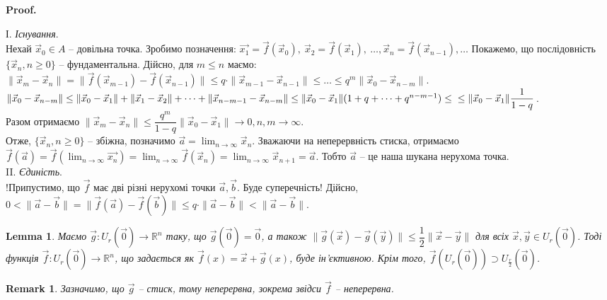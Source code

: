 \documentclass[a4paper, 10pt]{article}
\makeatletter
\theoremstyle{theoremdd}
\theoremstyle{theoremdd}
\theoremstyle{theoremdd}
\theoremstyle{theoremdd}
\theoremstyle{theoremdd}
\theoremstyle{theoremdd}
\theoremstyle{theoremdd}
\newtheorem{remark}[theorem]{Remark}
\theoremstyle{theoremdd}
\newtheorem{lemma}[theorem]{Lemma}
\theoremstyle{theoremdd}
\renewenvironment{proof}[1][Proof.\\]{\par
\pushQED{\hfill \qed}%
\normalfont \topsep6\p@\@plus6\p@\relax
\trivlist
\item\relax
{\bfseries
#1\@addpunct{.}}\hspace\labelsep\ignorespaces
}{%
\popQED\endtrivlist\@endpefalse
}
\makeatother
\begin{document}
\begin{proof}
І. \textit{Існування}.\\
Нехай $\vec{x}_0 \in A$ -- довільна точка. Зробимо позначення: $\vec{x_1} = \vec{f}(\vec{x}_0),\ \vec{x}_2 = \vec{f}(\vec{x}_1),\ \dots, \vec{x}_n = \vec{f}(\vec{x}_{n-1}), \dots$ Покажемо, що послідовність $\{\vec{x}_n, n \geq 0\}$ -- фундаментальна. Дійсно, для $m \leq n$ маємо:\\
$\|\vec{x}_m - \vec{x}_n\| = \|\vec{f}(\vec{x}_{m-1})- \vec{f}(\vec{x}_{n-1})\| \leq q \cdot \|\vec{x}_{m-1} - \vec{x}_{n-1} \| \leq \dots \leq q^m \|\vec{x}_0 - \vec{x}_{n-m}\|$.\\
$\|\vec{x}_0 - \vec{x}_{n-m}\| \leq \|\vec{x}_0 - \vec{x}_1\| + \| \vec{x}_1 - \vec{x}_2 \| + \dots + \| \vec{x}_{n-m-1} - \vec{x}_{n-m}\| \leq \|\vec{x}_0 - \vec{x}_1\|(1+q+\dots+q^{n-m-1}) \leq \\
\leq \| \vec{x}_0 - \vec{x}_1 \| \dfrac{1}{1-q}$.\\
Разом отримаємо $\| \vec{x}_m - \vec{x}_n \| \leq \dfrac{q^m}{1-q} \| \vec{x}_0 - \vec{x}_1 \| \to 0, n,m \to \infty$.\\
Отже, $\{\vec{x}_n, n \geq 0\}$ -- збіжна, позначимо $\vec{a} = \displaystyle\lim_{n \to \infty} \vec{x}_n$. Зважаючи на неперервність стиска, отримаємо $\displaystyle \vec{f}(\vec{a}) = \vec{f}\left( \lim_{n \to \infty} \vec{x_n} \right) = \lim_{n \to \infty} \vec{f}(\vec{x}_n) = \lim_{n \to \infty} \vec{x}_{n+1} = \vec{a}$. Тобто $\vec{a}$ -- це наша шукана нерухома точка.
\bigskip \\
II. \textit{Єдиність}.\\
!Припустимо, що $\vec{f}$ має дві різні нерухомі точки $\vec{a},\vec{b}$. Буде суперечність! Дійсно,\\
$0 < \|\vec{a} -\vec{b}\| = \| \vec{f}(\vec{a}) - \vec{f}(\vec{b}) \| \leq q \cdot \| \vec{a} - \vec{b}\| < \| \vec{a} - \vec{b} \|$.
\end{proof}

\begin{lemma}
Маємо $\vec{g} \colon U_r(\vec{0}) \to \mathbb{R}^n$ таку, що $\vec{g}(\vec{0}) = \vec{0}$, а також $\| \vec{g}(\vec{x}) - \vec{g}(\vec{y}) \| \leq \dfrac{1}{2} \|\vec{x} - \vec{y}\|$ для всіх $\vec{x},\vec{y} \in U_r(\vec{0})$. Тоді функція $\vec{f} \colon U_r(\vec{0}) \to \mathbb{R}^n$, що задається як $\vec{f}(x) = \vec{x} + \vec{g}(x)$, буде ін'єктивною. Крім того, $\vec{f}(U_r(\vec{0})) \supset U_{\frac{r}{2}}(\vec{0})$.
\end{lemma}

\begin{remark}
Зазначимо, що $\vec{g}$ -- стиск, тому неперервна, зокрема звідси $\vec{f}$ -- неперервна.
\end{remark}
\end{document}
